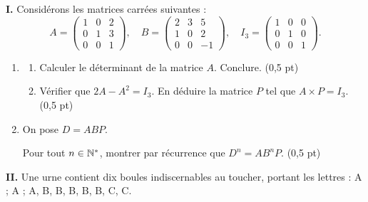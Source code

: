




\noindent\textbf{I.} Considérons les matrices carrées suivantes :
$$
A = \begin{pmatrix} 1 & 0 & 2 \\ 0 & 1 & 3 \\ 0 & 0 & 1 \end{pmatrix}, \quad
B = \begin{pmatrix} 2 & 3 & 5 \\ 1 & 0 & 2 \\ 0 & 0 & -1 \end{pmatrix}, \quad
I_3 = \begin{pmatrix} 1 & 0 & 0 \\ 0 & 1 & 0 \\ 0 & 0 & 1 \end{pmatrix}.
$$

\begin{enumerate}
	\item
	\begin{enumerate}
		\item Calculer le déterminant de la matrice $A$. Conclure. \hfill (0,5 pt)
		\item Vérifier que $2A - A^2 = I_3$. En déduire la matrice $P$ tel que $A \times P = I_3$. \hfill (0,5 pt)
	\end{enumerate}
	\item On pose $D = ABP$.

	Pour tout $n \in \mathbb{N}^*$, montrer par récurrence que $D^n = AB^nP$. \hfill (0,5 pt)
\end{enumerate}

\bigskip

\noindent\textbf{II.} Une urne contient dix boules indiscernables au toucher, portant les lettres : A ; A ; A, B, B, B, B, B, C, C.

